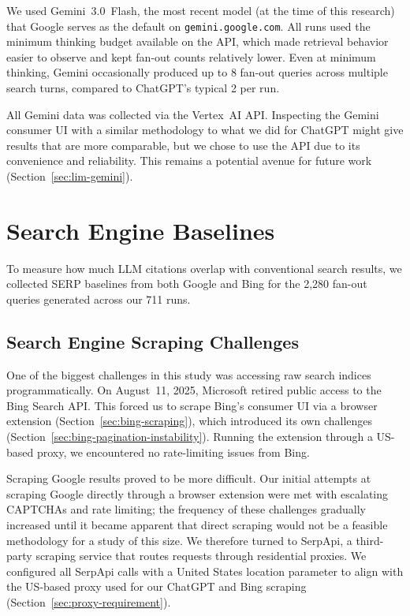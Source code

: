 We used Gemini~3.0~Flash, the most recent model (at the time of this research) that Google serves as the default on \texttt{gemini.google.com}. All runs used the minimum thinking budget available on the API, which made retrieval behavior easier to observe and kept fan-out counts relatively lower. Even at minimum thinking, Gemini occasionally produced up to 8 fan-out queries across multiple search turns, compared to ChatGPT's typical 2 per run.

All Gemini data was collected via the Vertex~AI API. Inspecting the Gemini consumer UI with a similar methodology to what we did for ChatGPT might give results that are more comparable, but we chose to use the API due to its convenience and reliability. This remains a potential avenue for future work (Section~\ref{sec:lim-gemini}).

\section{Search Engine Baselines}
\label{sec:serp-baselines}

To measure how much LLM citations overlap with conventional search results, we collected SERP baselines from both Google and Bing for the 2{,}280 fan-out queries generated across our 711 runs.

\subsection{Search Engine Scraping Challenges}
\label{sec:ethical-legal}
\label{sec:structural-pivot}

One of the biggest challenges in this study was accessing raw search indices programmatically. On August~11, 2025, Microsoft retired public access to the Bing Search API. This forced us to scrape Bing's consumer UI
 via a browser extension (Section~\ref{sec:bing-scraping}), which introduced its own challenges (Section~\ref{sec:bing-pagination-instability}). Running the extension through a 
 US-based proxy, we encountered no rate-limiting issues from Bing.

Scraping Google results proved to be more difficult. Our initial attempts at scraping Google directly through a browser extension were met with escalating CAPTCHAs and rate limiting; the frequency of these challenges gradually increased until it became apparent that direct scraping would not be a feasible methodology for a study of this size. We therefore turned to SerpApi, a third-party scraping service that routes requests through residential proxies. We configured all SerpApi calls with a United States location parameter to align with the US-based proxy used for our ChatGPT and Bing scraping (Section~\ref{sec:proxy-requirement}).

